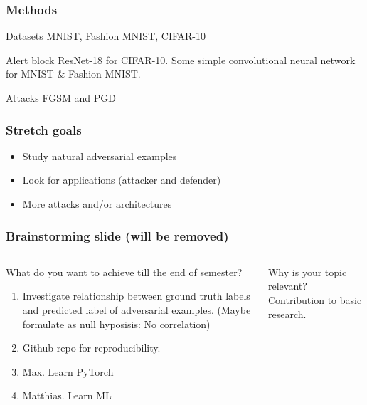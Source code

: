 \documentclass[10pt,usepdftitle=false,aspectratio=169]{beamer}
\begin{document}
\begin{frame}[fragile]
	\frametitle{Methods}
		\begin{block}{Datasets}
			MNIST, Fashion MNIST, CIFAR-10
		\end{block}
		\begin{alertblock}{Alert block}
			ResNet-18 for CIFAR-10.
			Some simple convolutional neural network for MNIST \& Fashion MNIST.
		\end{alertblock}
		\begin{alertblock}{Attacks}
			FGSM and PGD
		\end{alertblock}

\end{frame}

\begin{frame}[fragile]
	\frametitle{Stretch goals}
	\begin{itemize}
		\item Study natural adversarial examples
		\item Look for applications (attacker and defender)
		\item More attacks and/or architectures
	\end{itemize}
\end{frame}


\begin{frame}[fragile]
	\frametitle{Brainstorming slide (will be removed)}
	\begin{columns}
		\begin{column}{.5\columnwidth}
			\begin{alertblock}{What do you want to achieve till the end of semester?}
				\begin{enumerate}
					\item Investigate relationship between ground truth labels and predicted label of adversarial examples. (Maybe formulate as null hyposisis: No correlation)
					\item Github repo for reproducibility.
					\item Max. Learn PyTorch
					\item Matthias. Learn ML  
				\end{enumerate}
			\end{alertblock}
		\end{column}
		\begin{column}{.5\columnwidth}
			\begin{block}{Why is your topic relevant?}
				Contribution to basic research. 
			\end{block}
		\end{column}
	\end{columns}
\end{frame}
\end{document}
